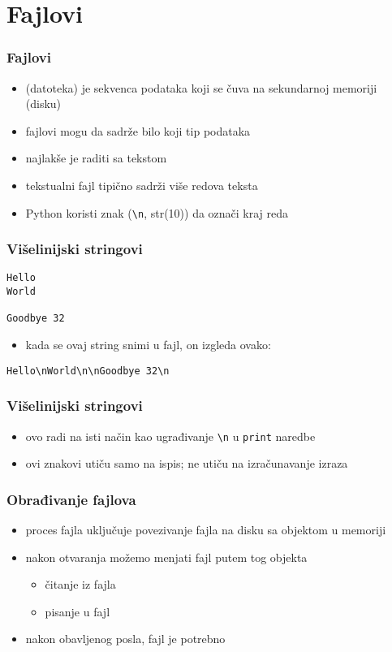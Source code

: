 \documentclass[utf8,compress]{beamer}
\begin{document}
\section{Fajlovi}

\begin{frame}[fragile]
  \frametitle{Fajlovi}
  \begin{itemize}
    \item {} (datoteka) je sekvenca podataka koji se čuva na sekundarnoj memoriji (disku)
    \item fajlovi mogu da sadrže bilo koji tip podataka
    \item najlakše je raditi sa tekstom
    \item tekstualni fajl tipično sadrži više redova teksta
    \item Python koristi  znak (\texttt{\textbackslash n}, str(10)) da označi kraj reda
  \end{itemize}
\end{frame}

\begin{frame}[fragile]
  \frametitle{Višelinijski stringovi}
\begin{verbatim}
Hello
World

Goodbye 32
\end{verbatim}
  \begin{itemize}
    \item kada se ovaj string snimi u fajl, on izgleda ovako:
  \end{itemize}
\begin{verbatim}
Hello\nWorld\n\nGoodbye 32\n
\end{verbatim}
\end{frame}

\begin{frame}[fragile]
  \frametitle{Višelinijski stringovi}
  \begin{itemize}
    \item ovo radi na isti način kao ugrađivanje \texttt{\textbackslash n} u \texttt{print} naredbe
    \item ovi znakovi utiču samo na ispis; ne utiču na izračunavanje izraza
  \end{itemize}
\end{frame}

\begin{frame}[fragile]
  \frametitle{Obrađivanje fajlova}
  \begin{itemize}
    \item proces  fajla uključuje povezivanje fajla na disku sa objektom u memoriji
    \item nakon otvaranja možemo menjati fajl putem tog objekta
    \begin{itemize}
      \item čitanje iz fajla
      \item pisanje u fajl
    \end{itemize}
    \item nakon obavljenog posla, fajl je potrebno 
  \end{itemize}
\end{frame}
\end{document}
